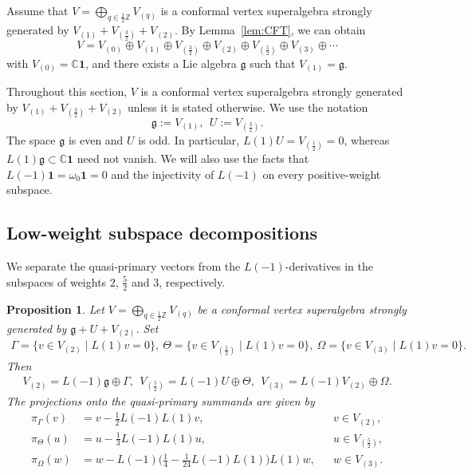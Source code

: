 \documentclass[12pt]{article}
\numberwithin{equation}{section}
\newtheorem{proposition}[theorem]{Proposition}
\theoremstyle{definition}
\theoremstyle{plain}
\newcommand{\bC}{\ensuremath{\mathbb{C}}}
\newcommand{\bZ}{\ensuremath{\mathbb{Z}}}
\newcommand{\fg}{\mathfrak{g}}
\newcommand{\bone}{\mathbf{1 }}
\begin{document}
Assume that $V=\bigoplus_{q\in\frac{1}{2}\bZ}V_{(q)}$ is a conformal vertex superalgebra strongly generated by $V_{(1)}+V_{(\frac{3}{2})}+V_{(2)}$. By Lemma~\ref{lem:CFT}, we can obtain
\begin{equation}\label{CFT}
    V=V_{(0)}\oplus V_{(1)}\oplus V_{(\frac{3}{2})}\oplus V_{(2)}\oplus V_{(\frac{5}{2})}\oplus V_{(3)}\oplus\cdots
\end{equation}
with $V_{(0)}=\bC\bone$, and there exists a Lie algebra $\fg$ such that $V_{(1)}=\fg$. 

Throughout this section, $V$ is a conformal vertex superalgebra strongly generated by $V_{(1)}+V_{(\frac32)}+V_{(2)}$ unless it is stated otherwise. We use the notation
\begin{equation*}
    \fg:=V_{(1)},\ \ U:=V_{(\frac{3}{2})}.
\end{equation*}
The space $\fg$ is even and $U$ is odd. In particular, $L(1)U=V_{(\frac{1}{2})}=0$, whereas $L(1)\fg\subset\bC\bone$ need not vanish. We will also use the facts that $L(-1)\bone=\omega_0\bone=0$ and the injectivity of $L(-1)$ on every positive-weight subspace.


\subsection{Low-weight subspace decompositions}
\hspace{1.5em}We separate the quasi-primary vectors from the $L(-1)$-derivatives in the subspaces of weights $2$, $\frac52$ and $3$, respectively.
\begin{proposition}\label{prop:decom}
    Let $V=\bigoplus_{q\in\frac12\bZ}V_{(q)}$ be a conformal
    vertex superalgebra strongly generated by
    $\fg+U+V_{(2)}$. Set
    \begin{align*}
        \Gamma=\{v\in V_{(2)}\mid L(1)v=0\},\ \Theta=\{v\in V_{(\frac52)}\mid L(1)v=0\},\ \Omega=\{v\in V_{(3)}\mid L(1)v=0\}.
    \end{align*}
    Then
    \begin{align*}
        V_{(2)}=L(-1)\fg\oplus\Gamma,\ \ V_{(\frac52)}=L(-1)U\oplus\Theta,\ \ V_{(3)}=L(-1)V_{(2)}\oplus\Omega.
    \end{align*}
    The projections onto the quasi-primary summands are given by
    \begin{align}
        \pi_\Gamma(v)&=v-\frac12L(-1)L(1)v,&&v\in V_{(2)},\label{proj.Gamma}\\
        \pi_\Theta(u)&=u-\frac13L(-1)L(1)u,&&u\in V_{(\frac52)},\label{proj.Theta}\\
        \pi_\Omega(w)
        &=w-L(-1)\Big(\frac14-\frac1{24}L(-1)L(1)\Big)L(1)w,&&w\in V_{(3)}.\label{proj.Omega}
    \end{align}
\end{proposition}
\end{document}
